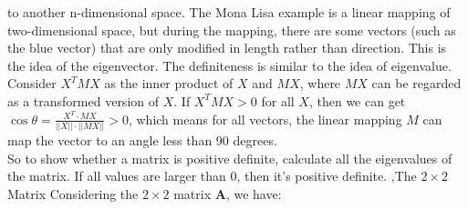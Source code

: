 \documentclass[12pt]{report}
\begin{document}
to another n-dimensional space.
The Mona Lisa example is a linear mapping of two-dimensional space, but during the mapping, there are some vectors (such as the blue vector)
that are only modified in length rather than direction. This is the idea of the eigenvector.
The definiteness is similar to the idea of eigenvalue. Consider $X^T MX$ as the inner product of $X$ and $MX$, where
$MX$ can be regarded as a transformed version of $X$. If $X^T MX>0$ for all $X$,
then we can get $\cos \theta=\frac{X^T \cdot MX}{||X||\cdot ||MX||}>0$, which means for all vectors, the linear mapping $M$ can map
the vector to an angle less than 90 degrees.\\
So to show whether a matrix is positive definite, calculate all the eigenvalues of the matrix. If all values are larger than 0, then it's positive definite.
\sep{The $2\times 2$ Matrix}
Considering the $2\times 2$ matrix $\mathbf{A}$, we have:
\end{document}
